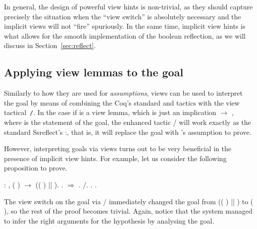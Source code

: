 In general, the design of powerful view hints is non-trivial, as they
should capture precisely the situation when the ``view switch'' is
absolutely necessary and the implicit views will not ``fire''
spuriously. In the same time, implicit view hints is what allows for
the smooth implementation of the boolean reflection, as we will
discuss in Section~\ref{sec:reflect}.


\subsection{Applying view lemmas to the goal}




Similarly to how they are used for \textit{assumptions}, views can be used to
interpret the goal by means of combining the Coq's standard 
and  tactics with the view tactical~\texttt{/}. In the case
if  is a view lemma, which is just an implication  \ensuremath{\rightarrow} , where
 is the statement of the goal, the enhanced tactic /  will
work exactly as the standard Ssreflect's :, that is, it will
replace the goal  with 's assumption  to prove.


However, interpreting goals via views turns out to be very beneficial
in the presence of implicit view hints. For example, let us consider
the following proposition to prove.


\begin{coqdoccode}
\coqdocemptyline
\coqdocnoindent
{} : \coqdockw{\ensuremath{\forall}} ,  ( ) \ensuremath{\rightarrow}  (( ) || ).\coqdoceol
\coqdocnoindent
{}.\coqdoceol
\coqdocnoindent
{}\ensuremath{\Rightarrow} .\coqdoceol
\coqdocnoindent
{}/.\coqdoceol
\coqdocnoindent
{}.\coqdoceol
\coqdocnoindent
{}.\coqdoceol
\coqdocemptyline
\end{coqdoccode}


The view switch on the goal via / immediately changed
the goal from  (( ) || ) to  ( ), so the rest of the
proof becomes trivial. Again, notice that the system managed to infer
the right arguments for the  hypothesis by analysing the
goal.


